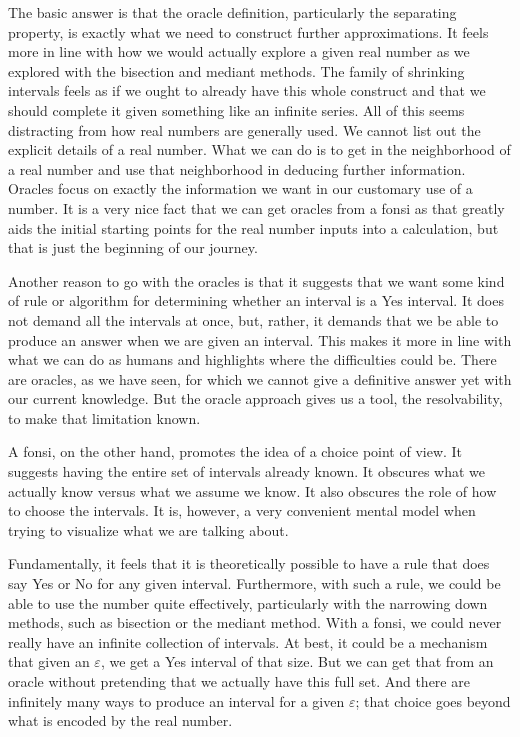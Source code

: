 \documentclass[12pt]{article}
\begin{document}
The basic answer is that the oracle definition, particularly the separating property, is exactly what we need to construct further approximations. It feels more in line with how we would actually explore a given real number as we explored with the bisection and mediant methods. The family of shrinking intervals feels as if we ought to already have this whole construct and that we should complete it given something like an infinite series. All of this seems distracting from how real numbers are generally used. We cannot list out the explicit details of a real number. What we can do is to get in the neighborhood of a real number and use that neighborhood in deducing further information. Oracles focus on exactly the information we want in our customary use of a number. It is a very nice fact that we can get oracles from a fonsi as that greatly aids the initial starting points for the real number inputs into a calculation, but that is just the beginning of our journey. 

Another reason to go with the oracles is that it suggests that we want some kind of rule or algorithm for determining whether an interval is a Yes interval. It does not demand all the intervals at once, but, rather, it demands that we be able to produce an answer when we are given an interval. This makes it more in line with what we can do as humans and highlights where the difficulties could be. There are oracles, as we have seen, for which we cannot give a definitive answer yet with our current knowledge. But the oracle approach gives us a tool, the resolvability, to make that limitation known. 

A fonsi, on the other hand, promotes the idea of a choice point of view. It suggests having the entire set of intervals already known. It obscures what we actually know versus what we assume we know. It also obscures the role of how to choose the intervals. It is, however, a very convenient mental model when trying to visualize what we are talking about. 

Fundamentally, it feels that it is theoretically possible to have a rule that does say Yes or No for any given interval. Furthermore, with such a rule, we could be able to use the number quite effectively, particularly with the narrowing down methods, such as bisection or the mediant method. With a fonsi, we could never really have an infinite collection of intervals. At best, it could be a mechanism that given an $\varepsilon$, we get a Yes interval of that size. But we can get that from an oracle without pretending that we actually have this full set. And there are infinitely many ways to produce an interval for a given $\varepsilon$; that choice goes beyond what is encoded by the real number. 
\end{document}
